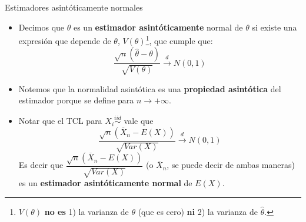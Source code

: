 \documentclass{beamer}
\theoremstyle{definition}
\newcommand{\cp}{\overset{P}{\rightarrow}}
\newcommand{\cw}{\overset{d}{\rightarrow}}
\begin{document}
\begin{frame}{\color{rosee} Estimadores asintóticamente normales}\small
\begin{itemize}
    \item Decimos que $\widehat{\theta}$ es un \textbf{estimador asintóticamente} normal de $\theta$ si existe una expresión que depende de $\theta$, $V(\theta)$\footnote{$V(\theta)$ \textbf{no es} 1) la varianza de $\theta$ (que es cero) \textbf{ni} 2) la varianza de $\widehat{\theta}$.}, que cumple que:
    \[\dfrac{\sqrt{n}(\widehat{\theta}-\theta)}{\sqrt{V(\theta)}}\cw N(0,1)\]
   \item Notemos que la normalidad asintótica es una \textbf{propiedad asintótica} del estimador porque se define para $n\to+\infty$. 
    \item Notar que el TCL para $X_i\stackrel{iid}{\sim}$ vale que \[\dfrac{\sqrt{n}(\overline{X}_n-E(X))}{\sqrt{Var(X)}}\cw N(0,1)\]
    Es decir que $\dfrac{\sqrt{n}(\overline{X}_n-E(X))}{\sqrt{Var(X)}}$ (o $\overline{X}_n$, se puede decir de ambas maneras) es un \textbf{estimador asintóticamente normal} de $E(X)$.
    \end{itemize}
\end{frame}


%
    
  
  
\end{document}
